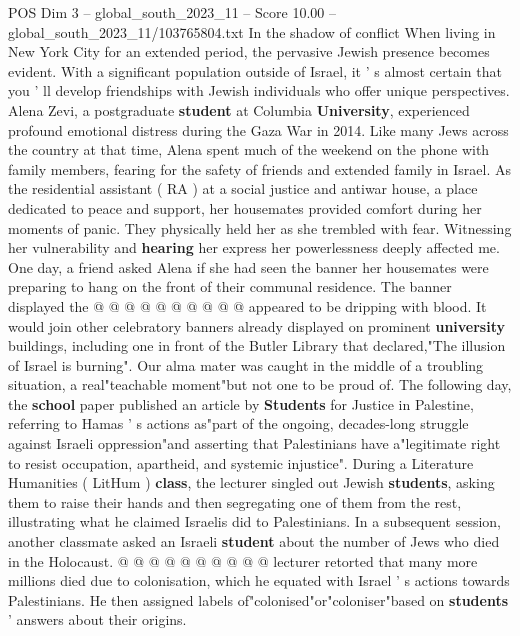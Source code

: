 \begin{textsample}{POS Dim 3 – global\_south\_2023\_11 – Score 10.00 – global\_south\_2023\_11/103765804.txt}  \label{ex:f3_pos_372}
In the shadow of conflict When living in New York City for an extended period, the pervasive Jewish presence becomes evident.
With a significant population outside of Israel, it ' s almost certain that you ' ll develop friendships with Jewish individuals who offer unique perspectives.
Alena Zevi, a postgraduate \textbf{student} at Columbia \textbf{University}, experienced profound emotional distress during the Gaza War in 2014.
Like many Jews across the country at that time, Alena spent much of the weekend on the phone with family members, fearing for the safety of friends and extended family in Israel.
As the residential assistant ( RA ) at a social justice and antiwar house, a place dedicated to peace and support, her housemates provided comfort during her moments of panic.
They physically held her as she trembled with fear.
Witnessing her vulnerability and \textbf{hearing} her express her powerlessness deeply affected me.
One day, a friend asked Alena if she had seen the banner her housemates were preparing to hang on the front of their communal residence.
The banner displayed the @ @ @ @ @ @ @ @ @ @ appeared to be dripping with blood.
It would join other celebratory banners already displayed on prominent \textbf{university} buildings, including one in front of the Butler Library that declared,"The illusion of Israel is burning".
Our alma mater was caught in the middle of a troubling situation, a real"teachable moment"but not one to be proud of.
The following day, the \textbf{school} paper published an article by \textbf{Students} for Justice in Palestine, referring to Hamas ' s actions as"part of the ongoing, decades-long struggle against Israeli oppression"and asserting that Palestinians have a"legitimate right to resist occupation, apartheid, and systemic injustice".
During a Literature Humanities ( LitHum ) \textbf{class}, the lecturer singled out Jewish \textbf{students}, asking them to raise their hands and then segregating one of them from the rest, illustrating what he claimed Israelis did to Palestinians.
In a subsequent session, another classmate asked an Israeli \textbf{student} about the number of Jews who died in the Holocaust. @ @ @ @ @ @ @ @ @ @ lecturer retorted that many more millions died due to colonisation, which he equated with Israel ' s actions towards Palestinians.
He then assigned labels of"colonised"or"coloniser"based on \textbf{students} ' answers about their origins.

\end{textsample}
